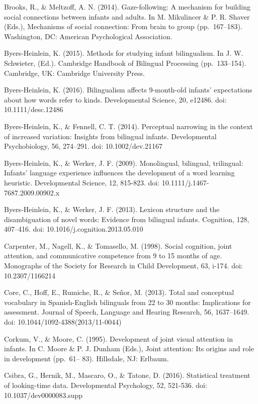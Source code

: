 \documentclass[,man,floatsintext]{apa6}
\begin{document}
Brooks, R., \& Meltzoff, A. N. (2014). Gaze-following: A mechanism for building social connections between infants and adults. In M. Mikulincer \& P. R. Shaver (Eds.), Mechanisms of social connection: From brain to group (pp.~167--183). Washington, DC: American Psychological Association.

Byers-Heinlein, K. (2015). Methods for studying infant bilingualism. In J. W. Schwieter, (Ed.). Cambridge Handbook of Bilingual Processing (pp.~133--154). Cambridge, UK: Cambridge University Press.

Byers-Heinlein, K. (2016). Bilingualism affects 9-month-old infants' expectations about how words refer to kinds. Developmental Science, 20, e12486. doi: 10.1111/desc.12486

Byers-Heinlein, K., \& Fennell, C. T. (2014). Perceptual narrowing in the context of increased variation: Insights from bilingual infants. Developmental Psychobiology, 56, 274--291. doi: 10.1002/dev.21167

Byers-Heinlein, K., \& Werker, J. F. (2009). Monolingual, bilingual, trilingual: Infants' language experience influences the development of a word learning heuristic. Developmental Science, 12, 815-823. doi: 10.1111/j.1467-7687.2009.00902.x

Byers-Heinlein, K., \& Werker, J. F. (2013). Lexicon structure and the disambiguation of novel words: Evidence from bilingual infants. Cognition, 128, 407--416. doi: 10.1016/j.cognition.2013.05.010

Carpenter, M., Nagell, K., \& Tomasello, M. (1998). Social cognition, joint attention, and communicative competence from 9 to 15 months of age. Monographs of the Society for Research in Child Development, 63, i-174. doi: 10.2307/1166214

Core, C., Hoff, E., Rumiche, R., \& Señor, M. (2013). Total and conceptual vocabulary in Spanish-English bilinguals from 22 to 30 months: Implications for assessment. Journal of Speech, Language and Hearing Research, 56, 1637--1649. doi: 10.1044/1092-4388(2013/11-0044)

Corkum, V., \& Moore, C. (1995). Development of joint visual attention in infants. In C. Moore \& P. J. Dunham (Eds.), Joint attention: Its origins and role in development (pp.~61-- 83). Hillsdale, NJ: Erlbaum.

Csibra, G., Hernik, M., Mascaro, O., \& Tatone, D. (2016). Statistical treatment of looking-time data. Developmental Psychology, 52, 521-536. doi: 10.1037/dev0000083.supp
\end{document}
